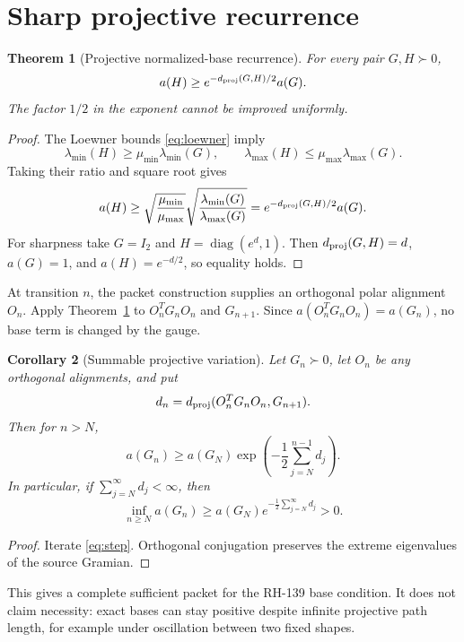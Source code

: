 \documentclass[12pt]{article}
\newtheorem{theorem}{Theorem}
\newtheorem{corollary}[theorem]{Corollary}
\begin{document}
\section{Sharp projective recurrence}
\begin{theorem}[Projective normalized-base recurrence]\label{thm:step}
For every pair $G,H\succ0$,
\begin{equation}\label{eq:step}
 a(H)\geq e^{-d_{\rm proj}(G,H)/2}a(G).
\end{equation}
The factor $1/2$ in the exponent cannot be improved uniformly.
\end{theorem}

\begin{proof}
The Loewner bounds \eqref{eq:loewner} imply
\[
 \lambda_{\min}(H)\geq\mu_{\min}\lambda_{\min}(G),
 \qquad
 \lambda_{\max}(H)\leq\mu_{\max}\lambda_{\max}(G).
\]
Taking their ratio and square root gives
\[
 a(H)\geq
 \sqrt{\frac{\mu_{\min}}{\mu_{\max}}}
 \sqrt{\frac{\lambda_{\min}(G)}{\lambda_{\max}(G)}}
 =e^{-d_{\rm proj}(G,H)/2}a(G).
\]
For sharpness take $G=I_2$ and $H=\operatorname{diag}(e^d,1)$.  Then
$d_{\rm proj}(G,H)=d$, $a(G)=1$, and $a(H)=e^{-d/2}$, so equality holds.
\end{proof}

At transition $n$, the packet construction supplies an orthogonal polar
alignment $O_n$.  Apply Theorem~\ref{thm:step} to
$O_n^TG_nO_n$ and $G_{n+1}$.  Since $a(O_n^TG_nO_n)=a(G_n)$, no base term is
changed by the gauge.

\begin{corollary}[Summable projective variation]\label{cor:sum}
Let $G_n\succ0$, let $O_n$ be any orthogonal alignments, and put
\[
 d_n=d_{\rm proj}(O_n^TG_nO_n,G_{n+1}).
\]
Then for $n>N$,
\begin{equation}\label{eq:product}
 a(G_n)\geq a(G_N)
 \exp\!\left(-\frac12\sum_{j=N}^{n-1}d_j\right).
\end{equation}
In particular, if $\sum_{j=N}^{\infty}d_j<\infty$, then
\[
 \inf_{n\geq N}a(G_n)\geq
 a(G_N)e^{-\frac12\sum_{j=N}^{\infty}d_j}>0.
\]
\end{corollary}
\begin{proof}
Iterate \eqref{eq:step}.  Orthogonal conjugation preserves the extreme
eigenvalues of the source Gramian.
\end{proof}

This gives a complete sufficient packet for the RH-139 base condition.  It
does not claim necessity: exact bases can stay positive despite infinite
projective path length, for example under oscillation between two fixed
shapes.
\end{document}
